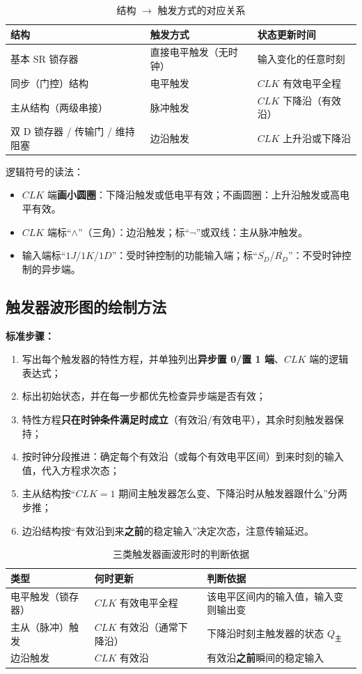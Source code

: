 \begin{table}[!htbp]
\centering
\caption{结构 $\rightarrow$ 触发方式的对应关系}
\begin{tabular}{lll}
\toprule
结构 & 触发方式 & 状态更新时间 \\
\midrule
基本 SR 锁存器 & 直接电平触发（无时钟） & 输入变化的任意时刻 \\
同步（门控）结构 & 电平触发 & $CLK$ 有效电平全程 \\
主从结构（两级串接） & 脉冲触发 & $CLK$ 下降沿（有效沿） \\
双 D 锁存器 / 传输门 / 维持阻塞 & 边沿触发 & $CLK$ 上升沿或下降沿 \\
\bottomrule
\end{tabular}
\end{table}

\noindent 逻辑符号的读法：
\begin{itemize}
    \item $CLK$ 端\textbf{画小圆圈}：下降沿触发或低电平有效；不画圆圈：上升沿触发或高电平有效。
    \item $CLK$ 端标“$\wedge$”（三角）：边沿触发；标“$\neg$”或双线：主从脉冲触发。
    \item 输入端标“$1J$/$1K$/$1D$”：受时钟控制的功能输入端；标“$\overline{S_D}$/$\overline{R_D}$”：不受时钟控制的异步端。
\end{itemize}

\subsection{触发器波形图的绘制方法}
\textbf{标准步骤：}
\begin{enumerate}
    \item 写出每个触发器的特性方程，并单独列出\textbf{异步置 0/置 1 端}、$CLK$ 端的逻辑表达式；
    \item 标出初始状态，并在每一步都优先检查异步端是否有效；
    \item 特性方程\textbf{只在时钟条件满足时成立}（有效沿/有效电平），其余时刻触发器保持；
    \item 按时钟分段推进：确定每个有效沿（或每个有效电平区间）到来时刻的输入值，代入方程求次态；
    \item 主从结构按“$CLK=1$ 期间主触发器怎么变、下降沿时从触发器跟什么”分两步推；
    \item 边沿结构按“有效沿到来\textbf{之前}的稳定输入”决定次态，注意传输延迟。
\end{enumerate}

\begin{table}[!htbp]
\centering
\caption{三类触发器画波形时的判断依据}
\begin{tabular}{lll}
\toprule
类型 & 何时更新 & 判断依据 \\
\midrule
电平触发（锁存器） & $CLK$ 有效电平全程 & 该电平区间内的输入值，输入变则输出变 \\
主从（脉冲）触发 & $CLK$ 有效沿（通常下降沿） & 下降沿时刻主触发器的状态 $Q_{\text{主}}$ \\
边沿触发 & $CLK$ 有效沿 & 有效沿\textbf{之前}瞬间的稳定输入 \\
\bottomrule
\end{tabular}
\end{table}

